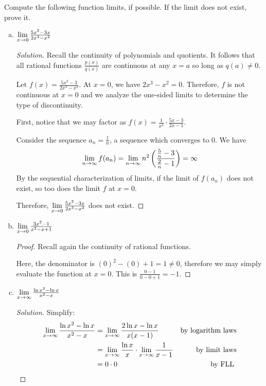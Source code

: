 \documentclass{agony}
\begin{document}
\question Compute the following function limits, if possible.
If the limit does not exist, prove it.
\begin{enumerate}[(a)]
  \item $\lim\limits_{x\to0} \frac{5x^2-3x}{2x^3-x^2}$
        \begin{proof}[Solution]
          Recall the continuity of polynomials and quotients.
          It follows that all rational functions $\frac{p(x)}{q(x)}$ are continuous at any $x=a$ so long as $q(a)\neq 0$.

          Let $f(x) = \frac{5x^2-3}{2x^3-x^2}$.
          At $x=0$, we have $2x^3-x^2=0$.
          Therefore, $f$ is not continuous at $x=0$ and we analyze the one-sided limits to determine the type of discontinuity.

          First, notice that we may factor as $f(x)=\frac{1}{x^2} \cdot \frac{5x-3}{2x-1}$.

          Consider the sequence $a_n=\frac1n$, a sequence which converges to 0. We have
          \[
            \lim_{n\to\infty} f(a_n)
            = \lim_{n\to\infty} n^2\left(\frac{\frac{5}{n}-3}{\frac{2}{n}-1}\right)
            = \infty
          \]
          By the sequential characterization of limits,
          if the limit of $f(a_n)$ does not exist, so too does the limit $f$ at $x=0$.

          Therefore, $\lim\limits_{x\to0} \frac{5x^2-3x}{2x^3-x^2}$ does not exist.
        \end{proof}
  \item $\lim\limits_{x\to0} \frac{3x^2-1}{x^2-x+1}$
        \begin{proof}
          Recall again the continuity of rational functions.

          Here, the denominator is $(0)^2-(0)+1 = 1 \neq 0$,
          therefore we may simply evaluate the function at $x=0$.
          This is $\frac{0-1}{0-0+1}=-1$.
        \end{proof}
  \item $\lim\limits_{x\to\infty} \frac{\ln x^2 - \ln x}{x^2-x}$
        \begin{proof}[Solution]
          Simplify:
          \begin{align*}
            \lim_{x\to\infty} \frac{\ln x^2 - \ln x}{x^2-x}
             & = \lim_{x\to\infty} \frac{2\ln x - \ln x}{x(x-1)} & \text{by logarithm laws}            \\
             & = \lim_{x\to\infty} \frac{\ln x}{x}\cdot\lim_{x\to\infty} \frac{1}{x-1} & \text{by limit laws}   \\
             & = 0\cdot0                                             & \text{by FLL \qedhere}
          \end{align*}
        \end{proof}
\end{enumerate}
\end{document}
